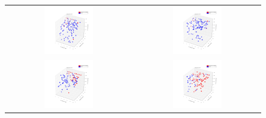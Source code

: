 \documentclass[a4paper,12pt]{article}
\begin{document}
  \begin{figure}[H]
  \centering
        \begin{tabular}{@{}cc@{}}
                \includegraphics[width = 0.4\textwidth]{./pics/Restricted_Parameter_space_d2500_w250.png} &
                \includegraphics[width = 0.4\textwidth]{./pics/Restricted_Parameter_space_d3000_w500.png} \\
                \includegraphics[width = 0.4\textwidth]{./pics/Restricted_Parameter_space_d2000_w2000.png} &
                \includegraphics[width = 0.4\textwidth]{./pics/Restricted_Parameter_space_d500_w3000.png} \\

\end{tabular}
\end{figure}
\end{document}
